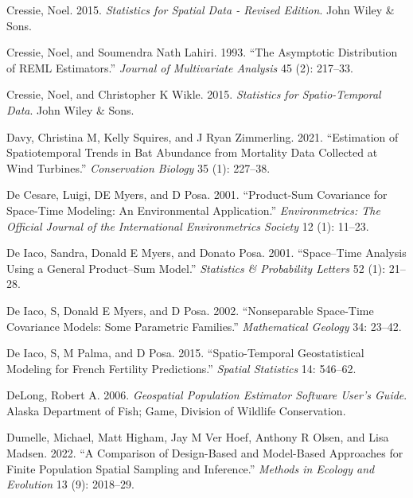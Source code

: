 \documentclass[]{article}    %
\newlength{\cslhangindent}
\newlength{\cslentryspacingunit} %
\newenvironment{CSLReferences}[2] %
 {%
  \setlength{\parindent}{0pt}
  \ifodd #1
  \let\oldpar\par
  \def\par{\hangindent=\cslhangindent\oldpar}
  \fi
  \setlength{\parskip}{#2\cslentryspacingunit}
 }%
 {}
\begin{document}
\begin{CSLReferences}{1}{0}
\leavevmode{}%
Cressie, Noel. 2015. \emph{Statistics for Spatial Data - Revised
Edition}. John Wiley \& Sons.

\leavevmode{}%
Cressie, Noel, and Soumendra Nath Lahiri. 1993. {``The Asymptotic
Distribution of REML Estimators.''} \emph{Journal of Multivariate
Analysis} 45 (2): 217--33.

\leavevmode{}%
Cressie, Noel, and Christopher K Wikle. 2015. \emph{Statistics for
Spatio-Temporal Data}. John Wiley \& Sons.

\leavevmode{}%
Davy, Christina M, Kelly Squires, and J Ryan Zimmerling. 2021.
{``Estimation of Spatiotemporal Trends in Bat Abundance from Mortality
Data Collected at Wind Turbines.''} \emph{Conservation Biology} 35 (1):
227--38.

\leavevmode{}%
De Cesare, Luigi, DE Myers, and D Posa. 2001. {``Product-Sum Covariance
for Space-Time Modeling: An Environmental Application.''}
\emph{Environmetrics: The Official Journal of the International
Environmetrics Society} 12 (1): 11--23.

\leavevmode{}%
De Iaco, Sandra, Donald E Myers, and Donato Posa. 2001. {``Space--Time
Analysis Using a General Product--Sum Model.''} \emph{Statistics \&
Probability Letters} 52 (1): 21--28.

\leavevmode{}%
De Iaco, S, Donald E Myers, and D Posa. 2002. {``Nonseparable Space-Time
Covariance Models: Some Parametric Families.''} \emph{Mathematical
Geology} 34: 23--42.

\leavevmode{}%
De Iaco, S, M Palma, and D Posa. 2015. {``Spatio-Temporal Geostatistical
Modeling for French Fertility Predictions.''} \emph{Spatial Statistics}
14: 546--62.

\leavevmode{}%
DeLong, Robert A. 2006. \emph{Geospatial Population Estimator Software
User's Guide}. Alaska Department of Fish; Game, Division of Wildlife
Conservation.

\leavevmode{}%
Dumelle, Michael, Matt Higham, Jay M Ver Hoef, Anthony R Olsen, and Lisa
Madsen. 2022. {``A Comparison of Design-Based and Model-Based Approaches
for Finite Population Spatial Sampling and Inference.''} \emph{Methods
in Ecology and Evolution} 13 (9): 2018--29.


\end{CSLReferences}
\end{document}
